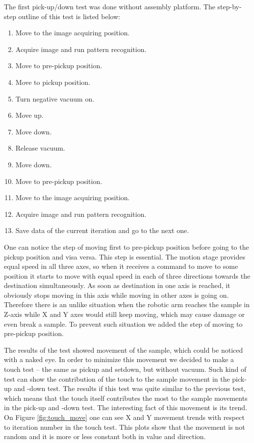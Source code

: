 The first pick-up/down test was done without assembly platform. The step-by-step outline of this test is listed below:
\begin{enumerate}
\setlength\itemsep{-0.5em}
\item Move to the image acquiring position.
\item Acquire image and run pattern recognition.
\item Move to pre-pickup position.
\item Move to pickup position.
\item Turn negative vacuum on.
\item Move up.
\item Move down.
\item Release vacuum.
\item Move down.
\item Move to pre-pickup position.
\item Move to the image acquiring position.
\item Acquire image and run pattern recognition.
\item Save data of the current iteration and go to the next one.
\end{enumerate}

One can notice the step of moving first to pre-pickup position before going to the pickup position and visa versa. This step is essential. The motion stage provides equal speed in all three axes, so when it receives a command to move to some position it starts to move with equal speed in each of three directions towards the destination simultaneously. As soon as destination in one axis is reached, it obviously stops moving in this axis while moving in other axes is going on. Therefore there is an unlike situation when the robotic arm reaches the sample in Z-axis while X and Y axes would still keep moving, which may cause damage or even break a sample. To prevent such situation we added the step of moving to pre-pickup position.

The results of the test showed movement of the sample, which could be noticed with a naked eye. In order to minimize this movement we decided to make a touch test -- the same as pickup and setdown, but without vacuum. Such kind of test can show the contribution of the touch to the sample movement in the pick-up and -down test. The results if this test was quite similar to the previous test, which means that the touch itself contributes the most to the sample movements in the pick-up and -down test. The interesting fact of this movement is its trend. On Figure \ref{fig:touch_move} one can see X and Y movement trends with respect to iteration number in the touch test. This plots show that the movement is not random and it is more or less constant both in value and direction.

